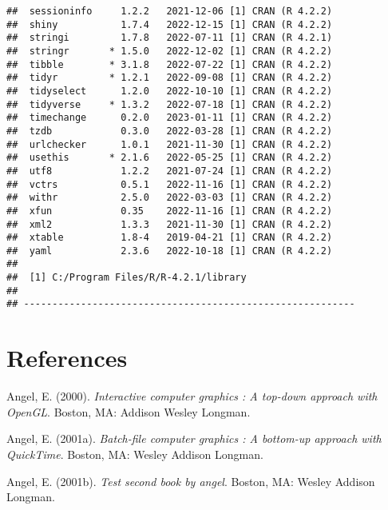 \documentclass[print]{nuthesis}
\newlength{\cslhangindent}
\newenvironment{CSLReferences}[2]%
{\setlength{\parindent}{0pt}%
\everypar{\setlength{\hangindent}{\cslhangindent}}\ignorespaces}%
{\par}
\begin{document}
\begin{verbatim}
##  sessioninfo     1.2.2   2021-12-06 [1] CRAN (R 4.2.2)
##  shiny           1.7.4   2022-12-15 [1] CRAN (R 4.2.2)
##  stringi         1.7.8   2022-07-11 [1] CRAN (R 4.2.1)
##  stringr       * 1.5.0   2022-12-02 [1] CRAN (R 4.2.2)
##  tibble        * 3.1.8   2022-07-22 [1] CRAN (R 4.2.2)
##  tidyr         * 1.2.1   2022-09-08 [1] CRAN (R 4.2.2)
##  tidyselect      1.2.0   2022-10-10 [1] CRAN (R 4.2.2)
##  tidyverse     * 1.3.2   2022-07-18 [1] CRAN (R 4.2.2)
##  timechange      0.2.0   2023-01-11 [1] CRAN (R 4.2.2)
##  tzdb            0.3.0   2022-03-28 [1] CRAN (R 4.2.2)
##  urlchecker      1.0.1   2021-11-30 [1] CRAN (R 4.2.2)
##  usethis       * 2.1.6   2022-05-25 [1] CRAN (R 4.2.2)
##  utf8            1.2.2   2021-07-24 [1] CRAN (R 4.2.2)
##  vctrs           0.5.1   2022-11-16 [1] CRAN (R 4.2.2)
##  withr           2.5.0   2022-03-03 [1] CRAN (R 4.2.2)
##  xfun            0.35    2022-11-16 [1] CRAN (R 4.2.2)
##  xml2            1.3.3   2021-11-30 [1] CRAN (R 4.2.2)
##  xtable          1.8-4   2019-04-21 [1] CRAN (R 4.2.2)
##  yaml            2.3.6   2022-10-18 [1] CRAN (R 4.2.2)
## 
##  [1] C:/Program Files/R/R-4.2.1/library
## 
## ----------------------------------------------------------
\end{verbatim}

\backmatter

\hypertarget{references}{%
\chapter*{References}\label{references}}

\noindent

\setlength{\parindent}{-0.20in}
\setlength{\leftskip}{0.20in}
\setlength{\parskip}{8pt}

\hypertarget{refs}{}
\begin{CSLReferences}{1}{0}
\leavevmode{}%
Angel, E. (2000). \emph{Interactive computer graphics : A top-down approach with OpenGL}. Boston, MA: Addison Wesley Longman.

\leavevmode{}%
Angel, E. (2001a). \emph{Batch-file computer graphics : A bottom-up approach with QuickTime}. Boston, MA: Wesley Addison Longman.

\leavevmode{}%
Angel, E. (2001b). \emph{Test second book by angel}. Boston, MA: Wesley Addison Longman.

\end{CSLReferences}
\end{document}
